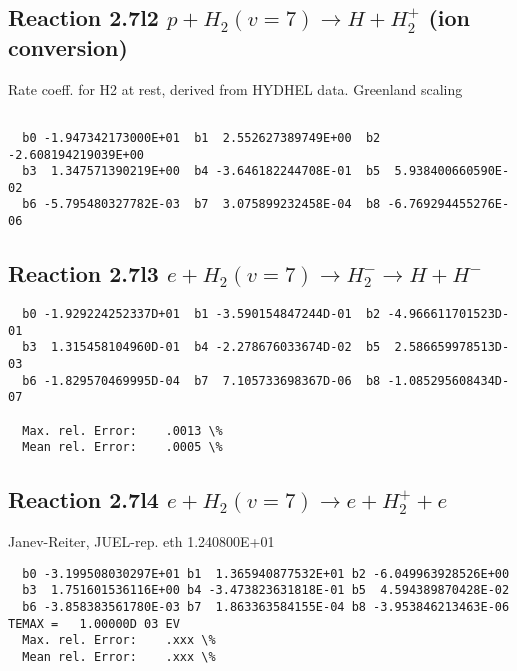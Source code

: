 \documentclass[12pt,dvipdfmx]{article}
\begin{document}
\subsection{
Reaction 2.7l2
$ p + H_2(v=7) \rightarrow H + H_2^+$ (ion conversion)
}
Rate coeff. for H2 at rest, derived from HYDHEL data. Greenland scaling


\begin{small}\begin{verbatim}

  b0 -1.947342173000E+01  b1  2.552627389749E+00  b2 -2.608194219039E+00
  b3  1.347571390219E+00  b4 -3.646182244708E-01  b5  5.938400660590E-02
  b6 -5.795480327782E-03  b7  3.075899232458E-04  b8 -6.769294455276E-06

\end{verbatim}\end{small}

\newpage

\subsection{
Reaction 2.7l3
 $ e + H_2(v=7) \rightarrow H_2^- \rightarrow H + H^-$
}


\begin{small}\begin{verbatim}
  b0 -1.929224252337D+01  b1 -3.590154847244D-01  b2 -4.966611701523D-01
  b3  1.315458104960D-01  b4 -2.278676033674D-02  b5  2.586659978513D-03
  b6 -1.829570469995D-04  b7  7.105733698367D-06  b8 -1.085295608434D-07

  Max. rel. Error:    .0013 \%
  Mean rel. Error:    .0005 \%
\end{verbatim}\end{small}

\subsection{
Reaction 2.7l4
 $ e + H_2(v=7) \rightarrow e + H_2^+  + e$
}
Janev-Reiter, JUEL-rep. eth 1.240800E+01

\begin{small}\begin{verbatim}
  b0 -3.199508030297E+01 b1  1.365940877532E+01 b2 -6.049963928526E+00
  b3  1.751601536116E+00 b4 -3.473823631818E-01 b5  4.594389870428E-02
  b6 -3.858383561780E-03 b7  1.863363584155E-04 b8 -3.953846213463E-06
TEMAX =   1.00000D 03 EV
  Max. rel. Error:    .xxx \%
  Mean rel. Error:    .xxx \%
\end{verbatim}\end{small}
\end{document}
